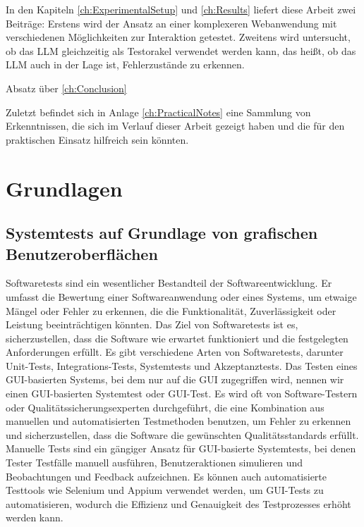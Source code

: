 In den Kapiteln \ref{ch:ExperimentalSetup} und \ref{ch:Results} liefert diese Arbeit zwei Beiträge:
Erstens wird der Ansatz an einer komplexeren Webanwendung mit verschiedenen Möglichkeiten zur Interaktion getestet.
Zweitens wird untersucht, ob das LLM gleichzeitig als Testorakel verwendet werden kann, das heißt, ob das LLM auch in der Lage ist, Fehlerzustände zu erkennen.

Absatz über \ref{ch:Conclusion}

Zuletzt befindet sich in Anlage \ref{ch:PracticalNotes} eine Sammlung von Erkenntnissen, die sich im Verlauf dieser Arbeit gezeigt haben und die für den praktischen Einsatz hilfreich sein könnten.



\chapter{Grundlagen}
\label{ch:Foundations}

\section{Systemtests auf Grundlage von grafischen Benutzeroberflächen}
\label{sec:Foundations:GUIBasedSystemTests}
Softwaretests sind ein wesentlicher Bestandteil der Softwareentwicklung.
Er umfasst die Bewertung einer Softwareanwendung oder eines Systems, um etwaige Mängel oder Fehler zu erkennen, die die Funktionalität, Zuverlässigkeit oder Leistung beeinträchtigen könnten.
Das Ziel von Softwaretests ist es, sicherzustellen, dass die Software wie erwartet funktioniert und die festgelegten Anforderungen erfüllt.
Es gibt verschiedene Arten von Softwaretests, darunter Unit-Tests, Integrations-Tests, Systemtests und Akzeptanztests.
Das Testen eines GUI-basierten Systems, bei dem nur auf die GUI zugegriffen wird, nennen wir einen GUI-basierten Systemtest oder GUI-Test.
Es wird oft von Software-Testern oder Qualitätssicherungsexperten durchgeführt, die eine Kombination aus manuellen und automatisierten Testmethoden benutzen, um Fehler zu erkennen und sicherzustellen, dass die Software die gewünschten Qualitätsstandards erfüllt.
Manuelle Tests sind ein gängiger Ansatz für GUI-basierte Systemtests, bei denen Tester Testfälle manuell ausführen, Benutzeraktionen simulieren und Beobachtungen und Feedback aufzeichnen.
Es können auch automatisierte Testtools wie Selenium und Appium verwendet werden, um GUI-Tests zu automatisieren, wodurch die Effizienz und Genauigkeit des Testprozesses erhöht werden kann.

